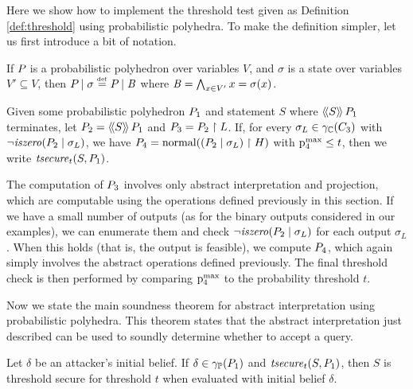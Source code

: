 \noindent Here we show how to implement the threshold test given as
Definition \ref{def:threshold} using probabilistic polyhedra. To make
the definition simpler, let us first introduce a bit of notation.

\begin{notation} If $ \pp{} $ is a probabilistic polyhedron over
  variables $ V $, and $
  \sigma $ is a state over variables $ V' \subseteq V $, then $ \absdcond{\pp{}}{\sigma} \defeq
  \absdcond{\pp{}}{\bexp} $ where $ \bexp = \bigwedge_{x \in V'} x =
  \sigma(x) $.
\end{notation}

\begin{definition}
Given some probabilistic polyhedron $\pp{1}$ and statement $S$ where
$\abspevalp{S}{\pp{1}} $ terminates, let
$\pp{2} = \abspevalp{S}{\pp{1}}$ and $\pp{3} =
\project{\pp{2}}{L}$. If, for every $ \sigma_L \in \pconc{\getpoly{3}}
$ with $ \neg\iszero{\absdcond{\pp{2}}{\sigma_L}}$, we have
$ \pp{4} =
\normal{\project{\paren{\absdcond{\pp{2}}{\sigma_L}}}{H}} $ 
with $\pmax{4} \leq t$, then we
write $\abspolicy{S}{\pp{1}}{t}$.
\end{definition}

The computation of $\pp{3}$ involves only abstract interpretation and
projection, which are computable using the operations defined previously
in this section.  If we have a small number of outputs (as for the binary outputs
considered in our examples), we can enumerate them and check
$\neg\iszero{\absdcond{\pp{2}}{\sigma_L}}$ for each output $\sigma_L$.
When this holds (that is, the output is feasible), we compute $\pp{4}$,
which again simply involves the abstract operations defined previously.
The final threshold check is then performed by comparing $\pmax{4}$ to
the probability threshold $t$.


Now we state the main soundness theorem for abstract interpretation
using probabilistic polyhedra.  This theorem states that the abstract
interpretation just described can be used to soundly determine whether
to accept a query.

\begin{theorem} \label{thm:pp:secure}
  Let $\delta$ be an attacker's initial belief.  If $\delta \in
  \ppconc{\pp{1}}$ and $\abspolicy{S}{\pp{1}}{t}$, then $S$ is threshold secure
  for threshold $t$ when evaluated with initial belief $\delta$.
\end{theorem}

